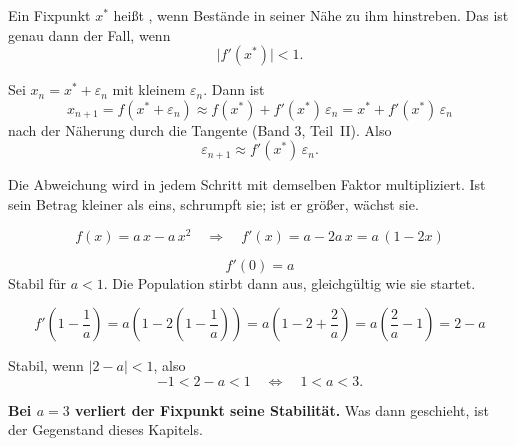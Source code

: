 \begin{merksatz}
Ein Fixpunkt $x^{*}$ heißt , wenn Bestände in seiner Nähe zu ihm hinstreben. Das ist genau dann der Fall, wenn
\[ \bigl|f'(x^{*})\bigr| < 1 . \]

Sei $x_n = x^{*} + \varepsilon_n$ mit kleinem $\varepsilon_n$. Dann ist
\[ x_{n+1} = f(x^{*}+\varepsilon_n) \approx f(x^{*}) + f'(x^{*})\,\varepsilon_n = x^{*} + f'(x^{*})\,\varepsilon_n \]
nach der Näherung durch die Tangente (Band 3, Teil~II). Also
\[ \varepsilon_{n+1} \approx f'(x^{*})\,\varepsilon_n . \]

\begin{center}
\begin{minipage}{0.9\textwidth}
Die Abweichung wird in jedem Schritt mit demselben Faktor multipliziert. Ist sein Betrag kleiner als eins, schrumpft sie; ist er größer, wächst sie.
\end{minipage}
\end{center}

\begin{center}
\begin{minipage}{0.88\textwidth}
\end{minipage}
\end{center}
\end{merksatz}

\begin{merksatz}
\[ f(x) = a\,x - a\,x^2 \quad\Longrightarrow\quad f'(x) = a - 2a\,x = a\,(1-2x) \]

\[ f'(0) = a \]
Stabil für $a < 1$. Die Population stirbt dann aus, gleichgültig wie sie startet.

\[ f'\!\left(1-\frac1a\right) = a\left(1 - 2\left(1-\frac1a\right)\right) = a\left(1 - 2 + \frac2a\right) = a\left(\frac2a - 1\right) = 2 - a \]

Stabil, wenn $|2-a| < 1$, also
\[ -1 < 2-a < 1 \quad\Longleftrightarrow\quad 1 < a < 3 . \]

\begin{center}
\begin{minipage}{0.9\textwidth}
\textbf{Bei $a = 3$ verliert der Fixpunkt seine Stabilität.} Was dann geschieht, ist der Gegenstand dieses Kapitels.
\end{minipage}
\end{center}
\end{merksatz}

